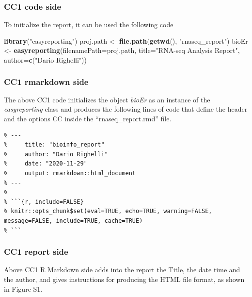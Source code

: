 \documentclass[]{article}
\newenvironment{Shaded}{\begin{snugshade}}{\end{snugshade}}
\newcommand{\DataTypeTok}[1]{\textcolor[rgb]{0.13,0.29,0.53}{#1}}
\newcommand{\KeywordTok}[1]{\textcolor[rgb]{0.13,0.29,0.53}{\textbf{#1}}}
\newcommand{\NormalTok}[1]{#1}
\newcommand{\StringTok}[1]{\textcolor[rgb]{0.31,0.60,0.02}{#1}}
\begin{document}
\hypertarget{cc1-code-side}{%
\subsubsection{CC1 code side}\label{cc1-code-side}}

To initialize the report, it can be used the following code

\begin{Shaded}
\begin{Highlighting}[]
\KeywordTok{library}\NormalTok{(}\StringTok{"easyreporting"}\NormalTok{)}
\NormalTok{proj.path <-}\StringTok{ }\KeywordTok{file.path}\NormalTok{(}\KeywordTok{getwd}\NormalTok{(), }\StringTok{"rnaseq_report"}\NormalTok{)}
\NormalTok{bioEr <-}\StringTok{ }\KeywordTok{easyreporting}\NormalTok{(}\DataTypeTok{filenamePath=}\NormalTok{proj.path, }\DataTypeTok{title=}\StringTok{"RNA-seq Analysis Report"}\NormalTok{,}
                       \DataTypeTok{author=}\KeywordTok{c}\NormalTok{(}\StringTok{"Dario Righelli"}\NormalTok{))}
\end{Highlighting}
\end{Shaded}

\hypertarget{cc1-rmarkdown-side}{%
\subsubsection{CC1 rmarkdown side}\label{cc1-rmarkdown-side}}

The above CC1 code initializes the object \emph{bioEr} as an instance of
the \emph{easyreporting} class and produces the following lines of code
that define the header and the options CC inside the
``rnaseq\_report.rmd'' file.

\begin{verbatim}
% ---
%     title: "bioinfo_report"
%     author: "Dario Righelli"
%     date: "2020-11-29"
%     output: rmarkdown::html_document
% ---
% 
% ```{r, include=FALSE}
% knitr::opts_chunk$set(eval=TRUE, echo=TRUE, warning=FALSE, message=FALSE, include=TRUE, cache=TRUE)
% ```
\end{verbatim}

\hypertarget{cc1-report-side}{%
\subsubsection{CC1 report side}\label{cc1-report-side}}

Above CC1 R Markdown side adds into the report the Title, the date time
and the author, and gives instructions for producing the HTML file
format, as shown in Figure S1.
\end{document}
